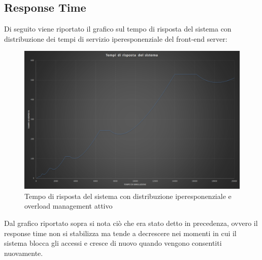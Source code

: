 \subsection{Response Time}

Di seguito viene riportato il grafico sul tempo di risposta del sistema con distribuzione dei 
tempi di servizio iperesponenziale del front-end server:

\begin{figure}[H]
 \centering
 \includegraphics[scale=0.45]{img/responseOM.png}
 \caption[Tempo di risposta del sistema con distribuzione iperesponenziale e overload management attivo]{Tempo di risposta del sistema con distribuzione iperesponenziale e overload management attivo}
 \label{fig:Tempo di risposta del sistema con distribuzione iperesponenziale e overload management attivo}
\end{figure}

Dal grafico riportato sopra si nota ci\`o che era stato detto in precedenza, ovvero il response time
non si stabilizza ma tende a decrescere nei momenti in cui il sistema blocca gli accessi e cresce di 
nuovo quando vengono consentiti nuovamente.

